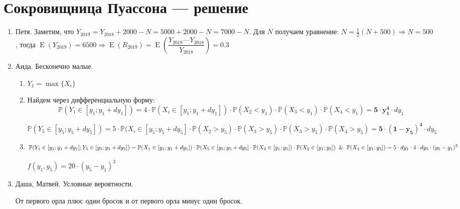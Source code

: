 \documentclass[a4paper,12pt]{article}
\DeclareMathOperator{\E}{E}
\def \P{\mathbb{P}}
\begin{document}
\newpage
\section{Сокровищница Пуассона — решение}

\begin{enumerate}
\item Петя.
Заметим, что $Y_{2019} = Y_{2018} + 2000 - N = 5000 + 2000 - N = 7000 - N$. Для $N$ получаем уравнение: $N = \frac{1}{2}(N + 500) \Rightarrow N = 500$, тогда $\E(Y_{2019}) = 6500 \Rightarrow \E(R_{2019}) = \E\left(\dfrac{Y_{2019} — Y_{2018}}{Y_{2018}}\right) = 0.3$
\item Аида. Бесконечно малые.
\begin{enumerate}
\item $Y_1=\max\{X_i\}$
\item Найдем через дифференциальную форму:
\[
\P(Y_1 \in [y_1;y_1+dy_1])=4\cdot \P (X_i \in [y_1;y_1+dy_1]) \cdot \P(X_2<y_1) \cdot \P(X_3<y_1) \cdot \P(X_4<y_1) = \mathbf{5\cdot y_1^4} \cdot dy_1
\]

\[
\P(Y_5 \in [y_5;y_5+dy_5])= 5\cdot \P(X_i \in [y_5;y_5+dy_5] \cdot \P(X_2>y_5) \cdot \P(X_3>y_5) \cdot \P(X_3>y_5) \cdot \P(X_4>y_5)=\mathbf{5\cdot (1-y_5)^4} \cdot dy_5
\]

\item
\[
\P(Y_1 \in [y_1;y_1+dy_1];Y_5 \in [y_5;y_5+dy_5] )= \P(X_1 \in [y_1;y_1+dy_1])\cdot \P(X_5 \in [y_5;y_5+dy_5] \cdot \P(X_3 \in [y_1;y_5]) \cdot  \P(X_2 \in [y_1;y_5])\And  \P(X_4 \in [y_1;y_5]) = 5 \cdot dy_1 \cdot 4 \cdot dy_5 \cdot (y_5-y_1)^3
\]

$f(y_1, y_5)= 20 \cdot (y_5-y_1)^3$
\end{enumerate}

\item Даша, Матвей. Условные вероятности.

От первого орла плюс один бросок и от первого орла минус один бросок.
\end{enumerate}
\end{document}
